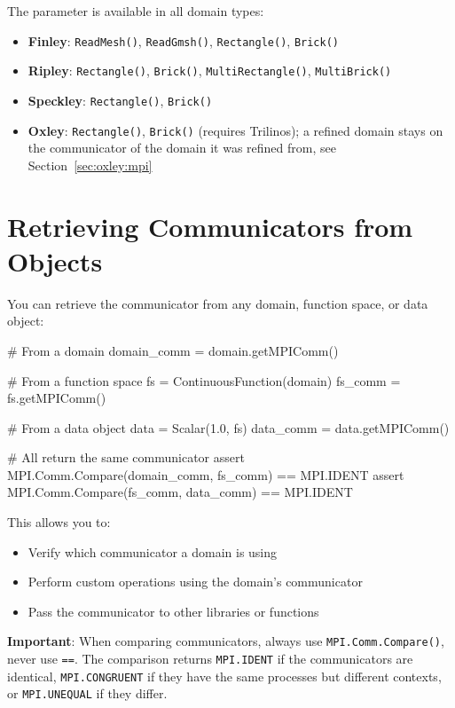 The  parameter is available in all domain types:
\begin{itemize}
\item \textbf{Finley}: \texttt{ReadMesh()}, \texttt{ReadGmsh()}, \texttt{Rectangle()}, \texttt{Brick()}
\item \textbf{Ripley}: \texttt{Rectangle()}, \texttt{Brick()}, \texttt{MultiRectangle()}, \texttt{MultiBrick()}
\item \textbf{Speckley}: \texttt{Rectangle()}, \texttt{Brick()}
\item \textbf{Oxley}: \texttt{Rectangle()}, \texttt{Brick()} (requires Trilinos); a refined \oxley domain stays on the communicator of the domain it was refined from, see Section~\ref{sec:oxley:mpi}
\end{itemize}

\section{Retrieving Communicators from \escript Objects}

You can retrieve the \MPI communicator from any \escript domain, function space, or data object:

\begin{python}
# From a domain
domain_comm = domain.getMPIComm()

# From a function space
fs = ContinuousFunction(domain)
fs_comm = fs.getMPIComm()

# From a data object
data = Scalar(1.0, fs)
data_comm = data.getMPIComm()

# All return the same communicator
assert MPI.Comm.Compare(domain_comm, fs_comm) == MPI.IDENT
assert MPI.Comm.Compare(fs_comm, data_comm) == MPI.IDENT
\end{python}

This allows you to:
\begin{itemize}
\item Verify which communicator a domain is using
\item Perform custom \MPI operations using the domain's communicator
\item Pass the communicator to other libraries or functions
\end{itemize}

\textbf{Important}: When comparing \MPI communicators, always use \texttt{MPI.Comm.Compare()}, never use \texttt{==}.
The comparison returns \texttt{MPI.IDENT} if the communicators are identical, \texttt{MPI.CONGRUENT} if they have the same processes but different contexts, or \texttt{MPI.UNEQUAL} if they differ.

